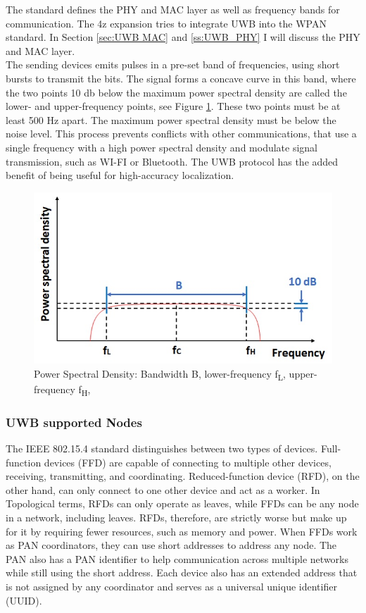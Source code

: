 The standard defines the PHY and MAC layer as well as frequency bands for communication.
The 4z expansion tries to integrate UWB into the WPAN standard. In Section \ref{sec:UWB MAC} and \ref{ss:UWB_PHY} I will discuss the PHY and MAC layer.\\

The sending devices emits pulses in a pre-set band of frequencies, using short bursts to transmit the bits.
The signal forms a concave curve in this band, where the two points 10 db below the maximum power spectral density are called the lower- and upper-frequency points, see Figure \ref{f:UWB_spectrum}.
These two points must be at least 500 Hz apart.
The maximum power spectral density must be below the noise level.
This process prevents conflicts with other communications, that use a single frequency with a high power spectral density and modulate signal transmission, such as WI-FI or Bluetooth.
The UWB protocol has the added benefit of being useful for high-accuracy localization.


\begin{figure}[ht!]
\centering
\includegraphics[width=\linewidth]{graphics/UWB_spectrum.jpg}
\caption{Power Spectral Density: Bandwidth B, lower-frequency f\textsubscript{L}, upper-frequency f\textsubscript{H}, \cite{hsu_2021}}
\label{f:UWB_spectrum}
\end{figure}


\subsubsection{UWB supported Nodes}

The IEEE 802.15.4 standard distinguishes between two types of devices.
Full-function devices (FFD) are capable of connecting to multiple other devices, receiving, transmitting, and coordinating. Reduced-function device (RFD), on the other hand, can only connect to one other device and act as a worker. 
In Topological terms, RFDs can only operate as leaves, while FFDs can be any node in a network, including leaves.
RFDs, therefore, are strictly worse but make up for it by requiring fewer resources, such as memory and power.
When FFDs work as PAN coordinators, they can use short addresses to address any node.
The PAN also has a PAN identifier to help communication across multiple networks while still using the short address.
Each device also has an extended address that is not assigned by any coordinator and serves as a universal unique identifier (UUID).


